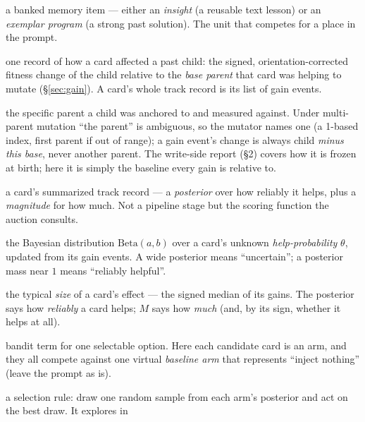 \documentclass[11pt]{article}
\newcommand{\Beta}{\mathrm{Beta}}
\begin{document}
\begingroup
\setlength{\parskip}{0pt}
\begin{description}[leftmargin=1.4em, itemsep=1.5pt, parsep=0pt, style=unboxed]
  \item[\textcolor{cardblue}{Card}] a banked memory item --- either an
    \emph{insight} (a reusable text lesson) or an \emph{exemplar program} (a strong
    past solution). The unit that competes for a place in the prompt.
  \item[\textcolor{cardblue}{Gain event}] one record of how a card affected a past
    child: the signed, orientation-corrected fitness change of the child relative to
    the \emph{base parent} that card was helping to mutate (\S\ref{sec:gain}). A card's
    whole track record is its list of gain events.
  \item[\textcolor{cardblue}{Base parent}] the specific parent a child was anchored
    to and measured against. Under multi-parent mutation ``the parent'' is ambiguous,
    so the mutator names one (a 1-based index, first parent if out of range); a gain
    event's change is always child \emph{minus this base}, never another parent. The
    write-side report (\S2) covers how it is frozen at birth; here it is simply the
    baseline every gain is relative to.
  \item[\textcolor{evgreen}{Reputation}] a card's summarized track record ---
    a \emph{posterior} over how reliably it helps, plus a \emph{magnitude} for how
    much. Not a pipeline stage but the scoring function the auction consults.
  \item[\textcolor{evgreen}{Posterior}] the Bayesian distribution $\Beta(a,b)$ over
    a card's unknown \emph{help-probability} $\theta$, updated from its gain events.
    A wide posterior means ``uncertain''; a posterior mass near $1$ means
    ``reliably helpful''.
  \item[\textcolor{evgreen}{Magnitude $M$}] the typical \emph{size} of a card's
    effect --- the signed median of its gains. The posterior says how
    \emph{reliably} a card helps; $M$ says how \emph{much} (and, by its sign,
    whether it helps at all).
  \item[\textcolor{harmred}{Arm}] bandit term for one selectable option. Here each
    candidate card is an arm, and they all compete against one virtual
    \emph{baseline arm} that represents ``inject nothing'' (leave the prompt as is).
  \item[\textcolor{harmred}{Thompson sampling}] a selection rule: draw one random
    sample from each arm's posterior and act on the best draw. It explores in

\end{description}
\end{document}
